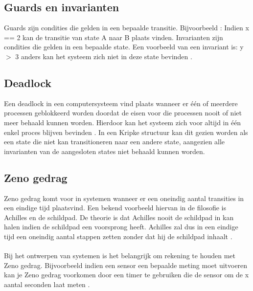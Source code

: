 \subsection{Guards en invarianten}
Guards zijn condities die gelden in een bepaalde transitie. Bijvoorbeeld : Indien x == 2 kan de transitie van state A naar B plaats vinden. Invarianten zijn condities die gelden in een bepaalde state. Een voorbeeld van een invariant is: y $>$ 3 anders kan het systeem zich niet in deze state bevinden \cite{behrmann2006tutorial}.
\subsection{Deadlock}
Een deadlock in een computersysteem vind plaats wanneer er één of meerdere processen geblokkeerd worden doordat de eisen voor die processen nooit of niet meer behaald kunnen worden. Hierdoor kan het systeem zich voor altijd in één enkel proces blijven bevinden \cite{holt1971some}. In een Kripke structuur kan dit gezien worden als een state die niet kan transitioneren naar een andere state, aangezien alle invarianten van de aangesloten states niet behaald kunnen worden. 
\subsection{Zeno gedrag}
Zeno gedrag komt voor in systemen wanneer er een oneindig aantal transities in een eindige tijd plaatsvind. Een bekend voorbeeld hiervan in de filosofie is Achilles en de schildpad. De theorie is dat Achilles nooit de schildpad in kan halen indien de schildpad een voorsprong heeft. Achilles zal dus in een eindige tijd een oneindig aantal stappen zetten zonder dat hij de schildpad inhaalt \cite{AchillesTortoise}.\\\\
Bij het ontwerpen van systemen is het belangrijk om rekening te houden met Zeno gedrag. Bijvoorbeeld indien een sensor een bepaalde meting moet uitvoeren kan je Zeno gedrag voorkomen door een timer te gebruiken die de sensor om de x aantal seconden laat meten \cite{ames2005sufficient}. 